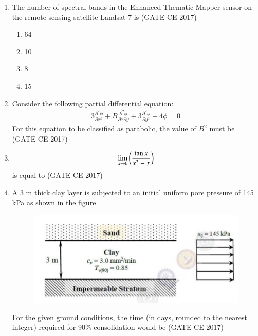 \documentclass[journal,12pt,onecolumn]{article}
\theoremstyle{remark}
\begin{document}
\begin{enumerate}
    \item The number of spectral bands in the Enhanced Thematic Mapper sensor on the remote sensing satellite Landsat-7 is \hfill (GATE-CE 2017)
    \begin{multicols}{4}
    \begin{enumerate}
        \item 64
        \item 10
        \item 8
        \item 15
    \end{enumerate}
    \end{multicols}

    \item Consider the following partial differential equation: 
    \begin{align}
    3 \frac{\partial^2 \phi}{\partial x^2} + B \frac{\partial^2 \phi}{\partial x \partial y} + 3 \frac{\partial^2 \phi}{\partial y^2} + 4 \phi = 0
    \end{align}
    For this equation to be classified as parabolic, the value of $B^2$ must be \underline{\hspace{3cm}}\hfill (GATE-CE 2017)

    \item 
    \begin{align}
    \lim_{x \to 0} \left(\frac{\tan x}{x^2 - x} \right)
    \end{align}
    is equal to \underline{\hspace{3cm}}\hfill (GATE-CE 2017)

    \item A 3 m thick clay layer is subjected to an initial uniform pore pressure of 145 kPa as shown in the figure 
    \begin{figure}[H]
    \centering
    \includegraphics[width=0.7\columnwidth]{figs/imageq22.jpg}  
    \caption{}
    \label{fig:22}
    \end{figure}
    For the given ground conditions, the time (in days, rounded to the nearest integer) required for 90\% consolidation would be \underline{\hspace{3cm}}\hfill (GATE-CE 2017)


\end{enumerate}
\end{document}
